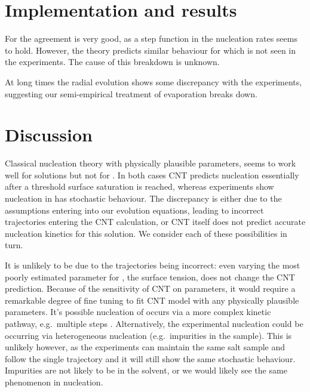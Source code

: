 \documentclass[11pt,twoside]{report}
\begin{document}

\section{Implementation and results}


For  the agreement is very good, as a step function in the nucleation rates seems to hold.
However, the theory predicts similar behaviour for  which is not seen in the experiments.
The cause of this breakdown is unknown.

At long times the radial evolution shows some discrepancy with the experiments, suggesting our semi-empirical treatment of evaporation breaks down.

\section{Discussion}


Classical nucleation theory with physically plausible parameters, seems to work well for  solutions but not for .
In both cases CNT predicts nucleation essentially after a threshold surface saturation is reached, whereas experiments show nucleation in  has stochastic behaviour.
The discrepancy is either due to the assumptions entering into our evolution equations, leading to incorrect trajectories entering the CNT calculation, or CNT itself does not predict accurate nucleation kinetics for this solution.
We consider each of these possibilities in turn.

It is unlikely to be due to the trajectories being incorrect: even varying the most poorly estimated parameter for , the surface tension, does not change the CNT prediction.
Because of the sensitivity of CNT on parameters, it would require a remarkable degree of fine tuning to fit CNT model with any physically plausible parameters.
It's possible nucleation of  occurs via a more complex kinetic pathway, e.g.\ multiple steps \cite{?,?,?}.
Alternatively, the experimental nucleation could be occurring via heterogeneous nucleation (e.g.\ impurities in the sample).
This is unlikely however, as the experiments can maintain the same salt sample and follow the single trajectory and it will still show the same stochastic behaviour.
Impurities are not likely to be in the solvent, or we would likely see the same phenomenon in  nucleation.
\end{document}

